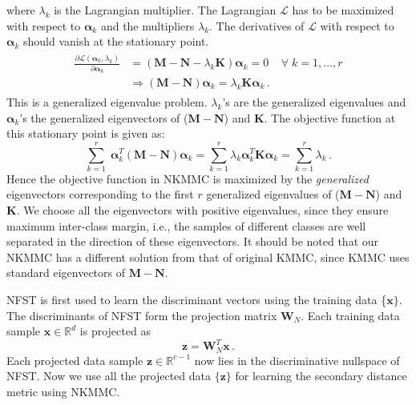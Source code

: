 \documentclass[runningheads]{llncs}
\begin{document}
where $\lambda_k$ is the Lagrangian multiplier. The Lagrangian $\mathcal{L}$ has to be maximized with respect to $\bm{\alpha}_{k}$ and the multipliers $\lambda_k$. The derivatives of $\mathcal{L}$ with respect to $\bm{\alpha}_k$ should vanish at the stationary point.
\begin{eqnarray}
\begin{aligned}
\frac{\partial \mathcal{L}(\bm{\alpha}_k,\lambda_k)}{\partial \bm{\alpha}_k} &= (\mathbf{M-N} - \lambda_k \mathbf{K})\bm{\alpha}_k =0 
 \; \;\;\;\forall \; k=1,\ldots, r\\
 & \Rightarrow (\mathbf{M-N})\bm{\alpha}_k = \lambda_k \mathbf{K} \bm{\alpha}_k  \,.
 \end{aligned}
\end{eqnarray}
This is a generalized eigenvalue problem. $\lambda_k$'s are the generalized eigenvalues and $\bm{\alpha}_k$'s the generalized eigenvectors of ($\mathbf{M-N}$) and $\mathbf{K}$. The objective function at this stationary point is given as:
\begin{equation}
\sum\limits_{k=1}^r \;  \bm{\alpha}^T_{k} (\mathbf{M}  -  \mathbf{N})\bm{\alpha}_{k} = \sum\limits_{k=1}^r \lambda_k \bm{\alpha}^T_{k}\mathbf{K}\bm{\alpha}_{k} = \sum\limits_{k=1}^r \lambda_k \,.
\end{equation}
\noindent Hence the objective function in NKMMC is maximized by the \textit{generalized} eigenvectors corresponding to the first $r$ generalized eigenvalues of ($\mathbf{M-N}$) and $\mathbf{K}$. We choose all the eigenvectors with positive eigenvalues, since they ensure maximum inter-class margin, i.e., the samples of different classes are well separated in the direction of these eigenvectors. It should be noted that our  NKMMC has a different solution from that of original KMMC\cite{haifeng:mmc}, since KMMC uses standard eigenvectors of $\mathbf{M-N}$. 


 
NFST is first used to  learn the  discriminant vectors using the training data \{$\mathbf{x}\}$. The discriminants of NFST form the projection matrix $\mathbf{W}_{N}$. Each training data sample $\mathbf{x}\in \mathbb{R}^d$ is projected as
\begin{equation}
\mathbf{z} = \mathbf{W}^T_{N} \mathbf{x} \,.
\end{equation}
Each projected data sample $\mathbf{z}\in \mathbb{R}^{c-1}$ now lies in the discriminative nullspace of NFST.  Now we use all the projected data $\{\mathbf{z}\}$ for learning the secondary distance metric using NKMMC.
\end{document}
